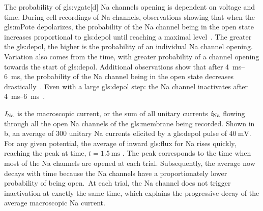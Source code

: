 \documentclass[class={myRUCProject}, crop=false]{standalone}
\begin{document}
The probability of \gls{gls:vgate}[d] \gls{Na} channels opening is dependent on voltage and time. 
During cell recordings of \gls{Na} channels, observations showing that when the \gls{gls:mPote} depolarizes, the probability of the \gls{Na} channel being in the open state increases proportional to \gls{gls:depol} until reaching a maximal level~\cite{Hammond2015ch4}. 
The greater the \gls{gls:depol}, the higher is the probability of an individual \gls{Na} channel opening. 
Variation also comes from the time, with greater probability of a channel opening towards the start of \gls{gls:depol}.
Additional observations show that after \qtyrange{4}{6}{\ms}, the probability of the \gls{Na} channel being in the open state decreases drastically~\cite{Hammond2015ch4}. 
Even with a large \gls{gls:depol} step: the \gls{Na} channel inactivates after \qtyrange{4}{6}{\ms}~\cite{Hammond2015ch4}. 

{}\(\mathit{I}_\mathrm{Na}\) is the macroscopic current, or the sum of all unitary currents \(\mathit{i}_\mathrm{Na}\) flowing through all the open \gls{Na} channels of the \gls{gls:membrane} being recorded. Shown in b, an average of \(\num{300}\) unitary \gls{Na} currents elicited by a \gls{gls:depol} pulse of \(\qty{40}{\mV}\). 
For any given potential, the average of inward \gls{gls:flux} for \gls{Na} rises quickly, reaching the peak at time, \(t=\qty{1.5}{\ms}\) \cite{Hammond2015ch4}. 
The peak corresponds to the time when most of the \gls{Na} channels are opened at each trial. 
Subsequently, the average now decays with time because the \gls{Na} channels have a proportionately lower probability of being open.\footnotemark~At each trial, the \gls{Na} channel does not trigger inactivation at exactly the same time, which explains the progressive decay of the average macroscopic \gls{Na} current. 

\end{document}

